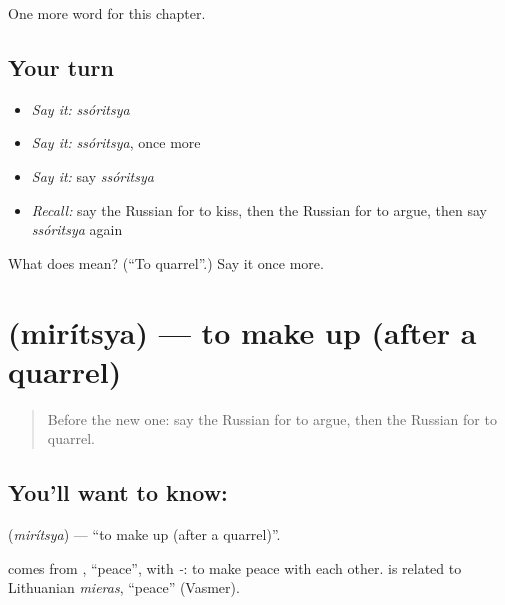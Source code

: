 \begin{grammarlens}[title={What you've built}]
One more word for this chapter.
\end{grammarlens}

\subsection*{Your turn}
\begin{itemize}
\raggedright
  \item \emph{Say it:} \emph{ssóritsya}
  \item \emph{Say it:} \emph{ssóritsya}, once more
  \item \emph{Say it:} say \emph{ssóritsya}
  \item \emph{Recall:} say the Russian for to kiss, then the Russian for to argue, then say \emph{ssóritsya} again
\end{itemize}

\begin{tcolorbox}[breakable,colback=teal!4,colframe=teal!35!black,title={Before you move on}]
What does  mean? (\textquotedblleft{}To quarrel\textquotedblright{}.) Say it once more.
\end{tcolorbox}
\section[\texorpdfstring{\ru{мириться} (mirítsya)}{мириться (mirítsya)}]{ (mirítsya) — to make up (after a quarrel)}

\label{lesson:RU-C177-miritsya}



\begin{quote}
Before the new one: say the Russian for to argue, then the Russian for to quarrel.
\end{quote}

\subsection*{You'll want to know: }
\textbf{} (\emph{mirítsya}) — \textquotedblleft{}to make up (after a quarrel)\textquotedblright{}.

\begin{cousinweb}
\textbf{} comes from \emph{}, \textquotedblleft{}peace\textquotedblright{}, with \emph{-}: to make peace with each other. \emph{} is related to Lithuanian \emph{mieras}, \textquotedblleft{}peace\textquotedblright{} (Vasmer).
\end{cousinweb}

